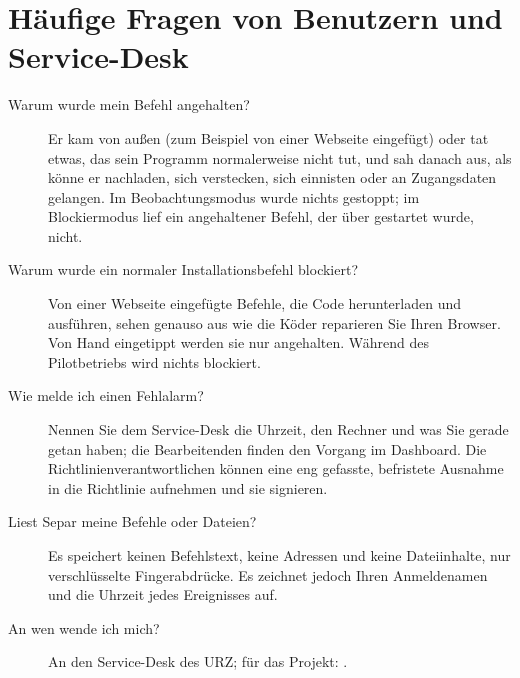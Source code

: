 \documentclass[11pt,a4paper]{article}
\begin{document}
\section{Häufige Fragen von Benutzern und Service-Desk}
\label{sec:faq}
\begin{description}
  \item[Warum wurde mein Befehl angehalten?] Er kam von außen (zum Beispiel von einer Webseite
    eingefügt) oder tat etwas, das sein Programm normalerweise nicht tut, und sah danach aus, als
    könne er nachladen, sich verstecken, sich einnisten oder an Zugangsdaten gelangen. Im
    Beobachtungsmodus wurde nichts gestoppt; im Blockiermodus lief ein angehaltener Befehl, der über
     gestartet wurde, nicht.
  \item[Warum wurde ein normaler Installationsbefehl blockiert?] Von einer Webseite eingefügte
    Befehle, die Code herunterladen und ausführen, sehen genauso aus wie die Köder
    \glqq reparieren Sie Ihren Browser\grqq. Von Hand eingetippt werden sie nur angehalten.
    Während des Pilotbetriebs wird nichts blockiert.
  \item[Wie melde ich einen Fehlalarm?] Nennen Sie dem Service-Desk die Uhrzeit, den Rechner und
    was Sie gerade getan haben; die Bearbeitenden finden den Vorgang im Dashboard. Die
    Richtlinienverantwortlichen können eine eng gefasste, befristete Ausnahme in die Richtlinie
    aufnehmen und sie signieren.
  \item[Liest Separ meine Befehle oder Dateien?] Es speichert keinen Befehlstext, keine Adressen und
    keine Dateiinhalte, nur verschlüsselte Fingerabdrücke. Es zeichnet jedoch Ihren Anmeldenamen und
    die Uhrzeit jedes Ereignisses auf.
  \item[An wen wende ich mich?] An den Service-Desk des URZ; für das Projekt: \contact.
\end{description}
\end{document}
